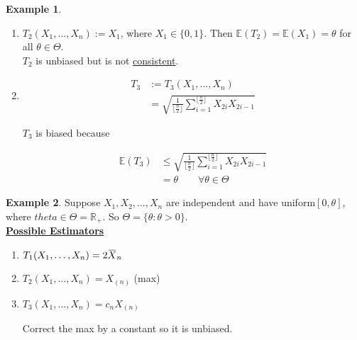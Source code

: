 \documentclass[12pt]{article}
\newcommand{\overbar}[1]{\mkern 1.5mu\overline{\mkern-1.5mu#1\mkern-1.5mu}\mkern 1.5mu}
\theoremstyle{definition}
\newtheorem*{example}{Example}
\begin{document}
\begin{example}
\begin{enumerate}
\item $T_2(X_1, \ldots, X_n) := X_1$, where $X_1 \in \{0, 1\}$. Then
$\mathbb{E}(T_2) = \mathbb{E}(X_1) = \theta$ for all $\theta \in \Theta$.\\

$T_2$ is unbiased but is not \underline{consistent}.

\item 
\begin{align*}
T_3 &:= T_3(X_1, \ldots, X_n) \\
&= \sqrt{\frac{1}{\lfloor \frac{n}{2} \rfloor} \sum_{i = 1}^{\lfloor \frac{n}{2} \rfloor} X_{2i} X_{2i-1} }
\end{align*}

$T_3$ is biased because

\begin{align*}
\mathbb{E}(T_3) &\leq \sqrt{\frac{1}{\lfloor \frac{n}{2} \rfloor} \sum_{i = 1}^{\lfloor \frac{n}{2} \rfloor} X_{2i} X_{2i-1} } \\
&= \theta \quad\quad \forall \theta \in \Theta
\end{align*}

\end{enumerate}
\end{example}

\begin{example}
Suppose $X_1, X_2, \ldots, X_n$ are independent and have uniform$[0, \theta]$,
where $theta \in \Theta = \mathbb{R}_+$. So $\Theta = \{\theta : \theta > 0\}$. \\


\underline{\textbf{Possible Estimators}}

\begin{enumerate}
\item $T_1(X_1, \ldots, X_n) = 2\overbar{X}_n$

\item $T_2(X_1, \ldots, X_n) = X_{(n)}$ (max)

\item $T_3(X_1, \ldots, X_n) = c_n X_{(n)}$

Correct the max by a constant so it is unbiased.
\end{enumerate}
\end{example}
\end{document}
